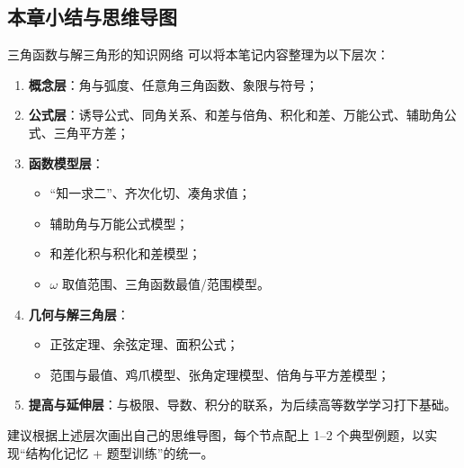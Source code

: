 \documentclass[a4paper,11pt]{ctexart}
\begin{document}
\subsection{本章小结与思维导图}

\begin{summarybox}[mathnote coverage=soft]{三角函数与解三角形的知识网络}
可以将本笔记内容整理为以下层次：
\begin{enumerate}
  \item \textbf{概念层}：角与弧度、任意角三角函数、象限与符号；
  \item \textbf{公式层}：诱导公式、同角关系、和差与倍角、积化和差、万能公式、辅助角公式、三角平方差；
  \item \textbf{函数模型层}：
  \begin{itemize}
    \item “知一求二”、齐次化切、凑角求值；
    \item 辅助角与万能公式模型；
    \item 和差化积与积化和差模型；
    \item $\omega$ 取值范围、三角函数最值/范围模型。
  \end{itemize}
  \item \textbf{几何与解三角层}：
  \begin{itemize}
    \item 正弦定理、余弦定理、面积公式；
    \item 范围与最值、鸡爪模型、张角定理模型、倍角与平方差模型；
  \end{itemize}
  \item \textbf{提高与延伸层}：与极限、导数、积分的联系，为后续高等数学学习打下基础。
\end{enumerate}
建议根据上述层次画出自己的思维导图，每个节点配上 1--2 个典型例题，以实现“结构化记忆 + 题型训练”的统一。
\end{summarybox}
\end{document}
